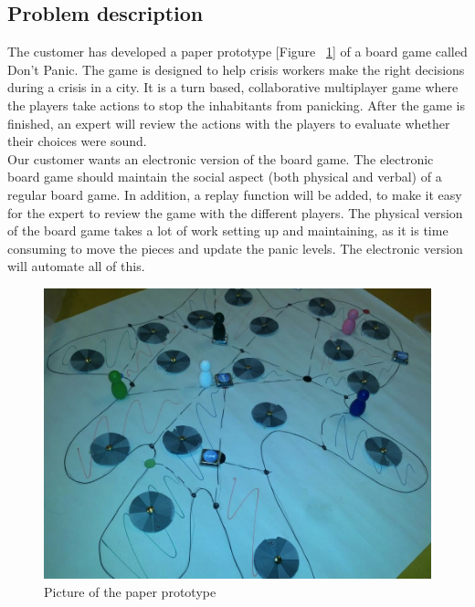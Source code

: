 \subsection{Problem description} 

The customer has developed a paper prototype [Figure ~\ref{fig:paperPrototype}] 
of a board game called Don’t Panic. The game is designed to help crisis workers 
make the right decisions during a crisis in a city. It is a turn based, 
collaborative multiplayer game where the players take actions to stop the 
inhabitants from panicking. After the game is finished, an expert will review 
the actions with the players to evaluate whether their choices were sound. 
\\
Our customer wants an electronic version of the board game. The electronic 
board game should maintain the social aspect (both physical and verbal) of a 
regular board game. In addition, a replay function will be added, to make it 
easy for the expert to review the game with the different players. The 
physical version of the board game takes a lot of work setting up and 
maintaining, as it is time consuming to move the pieces and update the panic 
levels. The electronic version will automate all of this.
\\

\begin{figure}[H]
  \centering
    \includegraphics[width=1.0\textwidth]{img/paper_prototype}
  \caption{Picture of the paper prototype} 
  \label{fig:paperPrototype}
\end{figure}



